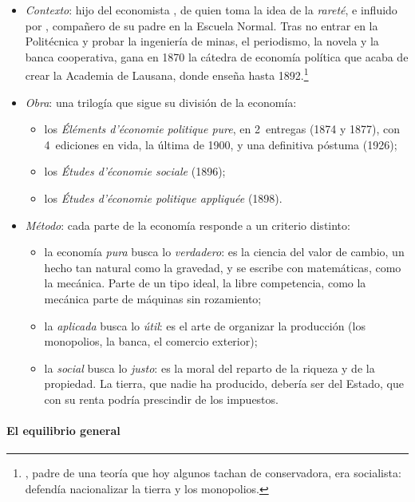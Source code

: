 \documentclass[11pt]{article}
\begin{document}
\begin{itemize}
\item \emph{Contexto}: hijo del economista , de quien toma la idea de la \emph{rareté}, e influido por , compañero de su padre en la Escuela Normal. Tras no entrar en la Politécnica y probar la ingeniería de minas, el periodismo, la novela y la banca cooperativa, gana en 1870 la cátedra de economía política que acaba de crear la Academia de Lausana, donde enseña hasta 1892.\footnote{, padre de una teoría que hoy algunos tachan de conservadora, era socialista: defendía nacionalizar la tierra y los monopolios\nocite{Daniel2021Histoire}.}
\item \emph{Obra}: una trilogía que sigue su división de la economía:
  \begin{itemize}
  \item los \emph{Éléments d'économie politique pure}, en 2~entregas (1874 y 1877), con 4~ediciones en vida, la última de 1900, y una definitiva póstuma (1926)\nocite{Walras1874Elements};
  \item los \emph{Études d'économie sociale} (1896)\nocite{Walras1896Etudes};
  \item los \emph{Études d'économie politique appliquée} (1898)\nocite{Walras1898Etudes}.
  \end{itemize}
\item \emph{Método}: cada parte de la economía responde a un criterio distinto:
  \begin{itemize}
  \item la economía \emph{pura} busca lo \emph{verdadero}: es la ciencia del valor de cambio, un hecho tan natural como la gravedad, y se escribe con matemáticas, como la mecánica. Parte de un tipo ideal, la libre competencia, como la mecánica parte de máquinas sin rozamiento;
  \item la \emph{aplicada} busca lo \emph{útil}: es el arte de organizar la producción (los monopolios, la banca, el comercio exterior);
  \item la \emph{social} busca lo \emph{justo}: es la moral del reparto de la riqueza y de la propiedad. La tierra, que nadie ha producido, debería ser del Estado, que con su renta podría prescindir de los impuestos.
  \end{itemize}
\end{itemize}

\paragraph{El equilibrio general}
\end{document}
